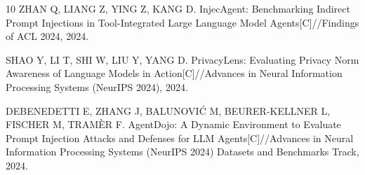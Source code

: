 \documentclass[UTF8,a4paper,zihao=-4,twocolumn]{ctexart}
\begin{document}
\begin{thebibliography}{10}
ZHAN Q, LIANG Z, YING Z, KANG D.
\newblock InjecAgent: Benchmarking Indirect Prompt Injections in Tool-Integrated Large Language Model Agents[C]//Findings of ACL 2024, 2024.

SHAO Y, LI T, SHI W, LIU Y, YANG D.
\newblock PrivacyLens: Evaluating Privacy Norm Awareness of Language Models in Action[C]//Advances in Neural Information Processing Systems (NeurIPS 2024), 2024.

DEBENEDETTI E, ZHANG J, BALUNOVI{\'C} M, BEURER-KELLNER L, FISCHER M, TRAM{\`E}R F.
\newblock AgentDojo: A Dynamic Environment to Evaluate Prompt Injection Attacks and Defenses for LLM Agents[C]//Advances in Neural Information Processing Systems (NeurIPS 2024) Datasets and Benchmarks Track, 2024.

\end{thebibliography}
\end{document}
